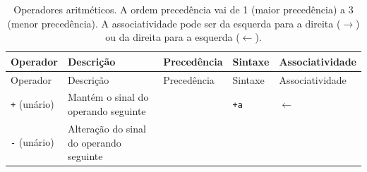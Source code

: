\documentclass[
  11pt,
  a4paper,
]{scrbook}
\begin{document}
\begin{longtable}[]{@{}
  >{\centering\arraybackslash}p{}
  >{\raggedright\arraybackslash}p{}
  >{\centering\arraybackslash}p{}
  >{\centering\arraybackslash}p{}
  >{\centering\arraybackslash}p{}@{}}
\caption{Operadores aritméticos. A ordem precedência vai de 1 (maior
precedência) a 3 (menor precedência). A associatividade pode ser da
esquerda para a direita (\(\rightarrow\)) ou da direita para a esquerda
(\(\leftarrow\)).}\label{tbl-operadores-aritmeticos}\tabularnewline
\toprule\noalign{}
\begin{minipage}[b]{\linewidth}\centering
Operador
\end{minipage} & \begin{minipage}[b]{\linewidth}\raggedright
Descrição
\end{minipage} & \begin{minipage}[b]{\linewidth}\centering
Precedência
\end{minipage} & \begin{minipage}[b]{\linewidth}\centering
Sintaxe
\end{minipage} & \begin{minipage}[b]{\linewidth}\centering
Associatividade
\end{minipage} \\
\midrule\noalign{}
\endfirsthead
\toprule\noalign{}
\begin{minipage}[b]{\linewidth}\centering
Operador
\end{minipage} & \begin{minipage}[b]{\linewidth}\raggedright
Descrição
\end{minipage} & \begin{minipage}[b]{\linewidth}\centering
Precedência
\end{minipage} & \begin{minipage}[b]{\linewidth}\centering
Sintaxe
\end{minipage} & \begin{minipage}[b]{\linewidth}\centering
Associatividade
\end{minipage} \\
\midrule\noalign{}
\endhead
\bottomrule\noalign{}
\endlastfoot
\texttt{+} (unário) & Mantém o sinal do operando seguinte & 1 &
\texttt{+a} & \(\leftarrow\) \\
\texttt{-} (unário) & Alteração do sinal do operando seguinte & 1 &

\end{longtable}
\end{document}
